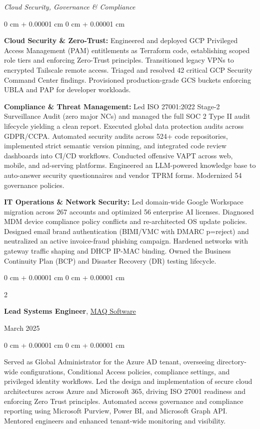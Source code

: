 \documentclass[10pt, letterpaper]{article}
\newenvironment{onecolentry}{
    \begin{adjustwidth}{
        0 cm + 0.00001 cm
    }{
        0 cm + 0.00001 cm
    }
}{
    \end{adjustwidth}
}
\newenvironment{twocolentry}[2][]{
    \onecolentry
    \def\secondColumn{#2}
    \setcolumnwidth{\fill, 4.5 cm}
    \begin{paracol}{2}
}{
    \switchcolumn \raggedleft \secondColumn
    \end{paracol}
    \endonecolentry
}
\begin{document}
\vspace{0.10 cm}
\textit{Cloud Security, Governance \& Compliance}
\begin{onecolentry}
    \textbf{Cloud Security \& Zero-Trust:} Engineered and deployed GCP Privileged Access Management (PAM) entitlements as Terraform code, establishing scoped role tiers and enforcing Zero-Trust principles. Transitioned legacy VPNs to encrypted Tailscale remote access. Triaged and resolved 42 critical GCP Security Command Center findings. Provisioned production-grade GCS buckets enforcing UBLA and PAP for developer workloads.

    \textbf{Compliance \& Threat Management:} Led ISO 27001:2022 Stage-2 Surveillance Audit (zero major NCs) and managed the full SOC 2 Type II audit lifecycle yielding a clean report. Executed global data protection audits across GDPR/CCPA. Automated security audits across 524+ code repositories, implemented strict semantic version pinning, and integrated code review dashboards into CI/CD workflows. Conducted offensive VAPT across web, mobile, and ad-serving platforms. Engineered an LLM-powered knowledge base to auto-answer security questionnaires and vendor TPRM forms. Modernized 54 governance policies.

    \textbf{IT Operations \& Network Security:} Led domain-wide Google Workspace migration across 267 accounts and optimized 56 enterprise AI licenses. Diagnosed MDM device compliance policy conflicts and re-architected OS update policies. Designed email brand authentication (BIMI/VMC with DMARC p=reject) and neutralized an active invoice-fraud phishing campaign. Hardened networks with gateway traffic shaping and DHCP IP-MAC binding. Owned the Business Continuity Plan (BCP) and Disaster Recovery (DR) testing lifecycle.
\end{onecolentry}

\vspace{0.2 cm}

\begin{twocolentry}{March 2025}
    \textbf{Lead Systems Engineer}, \href{https://maqsoftware.com/}{MAQ Software}
\end{twocolentry}

\vspace{0.10 cm}
\begin{onecolentry}
    Served as Global Administrator for the Azure AD tenant, overseeing directory-wide configurations, Conditional Access policies, compliance settings, and privileged identity workflows. Led the design and implementation of secure cloud architectures across Azure and Microsoft 365, driving ISO 27001 readiness and enforcing Zero Trust principles. Automated access governance and compliance reporting using Microsoft Purview, Power BI, and Microsoft Graph API. Mentored engineers and enhanced tenant-wide monitoring and visibility.
\end{onecolentry}
\end{document}
